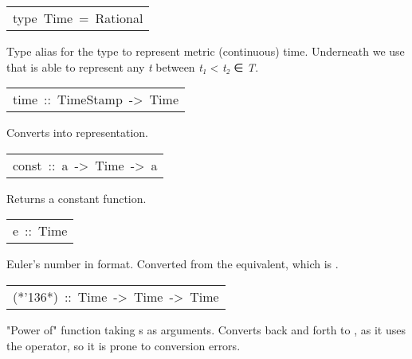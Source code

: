 \begin{haddockdesc}
\item[\begin{tabular}{@{}l}
type\ Time\ =\ Rational
\end{tabular}]\haddockbegindoc
Type alias for the type to represent metric (continuous)
 time. Underneath we use  that is able to represent any
 \emph{t} between \emph{t₁} < \emph{t₂} ∈ \emph{T}.\par

\end{haddockdesc}
\begin{haddockdesc}
\item[\begin{tabular}{@{}l}
time\ ::\ TimeStamp\ ->\ Time
\end{tabular}]\haddockbegindoc
Converts  into  representation.\par

\end{haddockdesc}
\begin{haddockdesc}
\item[\begin{tabular}{@{}l}
const\ ::\ a\ ->\ Time\ ->\ a
\end{tabular}]\haddockbegindoc
Returns a constant function.\par

\end{haddockdesc}
\begin{haddockdesc}
\item[\begin{tabular}{@{}l}
e\ ::\ Time
\end{tabular}]\haddockbegindoc
Euler's number in  format. Converted from the 
 equivalent, which is .\par

\end{haddockdesc}
\begin{haddockdesc}
\item[\begin{tabular}{@{}l}
(*{\char '136}*)\ ::\ Time\ ->\ Time\ ->\ Time
\end{tabular}]\haddockbegindoc
"Power of" function taking s as arguments. Converts back
 and forth to , as it uses the \haddockid{**} operator, so
 it is prone to conversion errors.\par

\end{haddockdesc}
